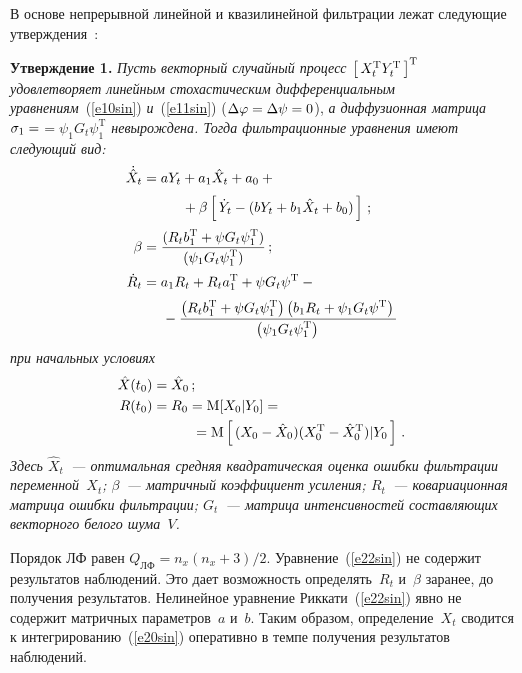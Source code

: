\begin{multicols}{2}
В основе непрерывной линейной и квазилинейной фильтрации лежат следующие утверждения~\cite{3sin, 4sin}:

\noindent
\textbf{Утверждение 1.}
\textit{Пусть векторный случайный процесс\linebreak  
$\left[\, X_t^{\mathrm{T}} Y_t^{\mathrm{T}}\,\right]^{\mathrm{T}}$ удовлетворяет линейным 
стохастическим дифференциальным уравнениям}~(\ref{e10sin}) \textit{и}~(\ref{e11sin})  
($\Delta\varphi=\Delta\psi=0$), \textit{а диффузионная матрица  $\sigma_1 =$\linebreak $=\psi_1 G_t\psi_1^{\mathrm{T}}$ невырождена. 
Тогда фильтрационные уравнения имеют следующий вид:}
\begin{align}
\dot{\hat X}_t &= a Y_t + a_1 \hat X_t + a_0 +{}\notag\\[2pt]
&\hspace{10mm}{}+\beta \lk \dot Y_t -(bY_t+ b_1 \hat X_t + b_0)\rk\,;\label{e20sin}\\[2pt]
\beta &= \fr{(R_t b_1^{\mathrm{T}} + \psi G_t \psi_1^{\mathrm{T}})}{(\psi_1 G_t \psi_1^{\mathrm{T}})}\,;\notag\\[2pt] %
\dot R_t &= a_1 R_t + R_t a_1^{\mathrm{T}} +\psi G_t \psi^{\mathrm{T}} - {}\notag\\[2pt]
&\hspace*{5mm}{}-\fr{\left(R_t b_1^{\mathrm{T}} +\psi G_t\psi_1^{\mathrm{T}}\right)
\left(b_1R_t +\psi_1G_t \psi^{\mathrm{T}}\right)}{\left(\psi_1 G_t \psi_1^{\mathrm{T}}\right)}\label{e22sin}
\end{align}
\textit{при начальных условиях}
\begin{align*}
\hat X(t_0) &=\hat X_0\,;\\
R(t_0)&=R_0 =\mm [X_0\vert Y_0]={}\\
&\hspace{10mm}{}=\mm \lk (X_0 - \hat X_0)(X_0^{\mathrm{T}} -\hat X_0^{\mathrm{T}})\vert Y_0\rk\,.
\end{align*}
\textit{Здесь $\hat X_t$~--- оптимальная средняя квадратическая оценка ошибки фильтрации переменной~$X_t$; 
$\beta$~--- мат\-рич\-ный коэффициент усиления; $R_t$~--- ковариационная матрица ошибки фильтрации; 
$G_t$~---  мат\-ри\-ца интенсивностей составляющих векторного  белого шума~$V$.}

\smallskip

Порядок ЛФ равен  $Q_{\mathrm{ЛФ}} =n_x (n_x+3)/2$. Уравнение~(\ref{e22sin}) 
не содержит результатов наблюдений. Это дает возможность определять~$R_t$ и~$\beta$ заранее, 
до получения результатов. Нелинейное уравнение Риккати~(\ref{e22sin}) явно не содержит матричных па\-ра\-мет\-ров~$a$ 
и~$b$. Таким образом, определение~$X_t$ сводится к интегрированию~(\ref{e20sin}) 
оперативно в темпе получения результатов наблюдений.


\end{multicols}
